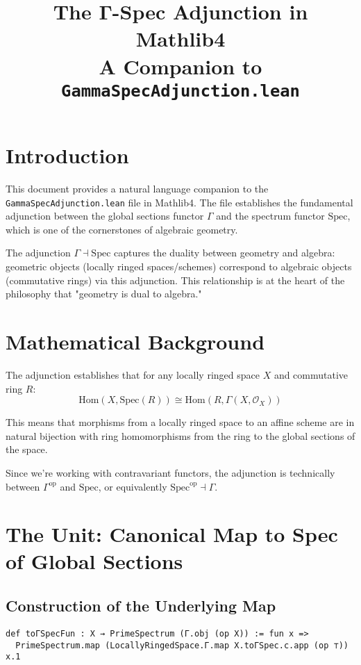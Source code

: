 \documentclass{article}
\title{The Γ-Spec Adjunction in Mathlib4\\
\large A Companion to \texttt{GammaSpecAdjunction.lean}}
\author{}
\date{}
\theoremstyle{definition}
\begin{document}
\maketitle

\section{Introduction}

This document provides a natural language companion to the \texttt{GammaSpecAdjunction.lean} file in Mathlib4. The file establishes the fundamental adjunction between the global sections functor $\Gamma$ and the spectrum functor $\mathrm{Spec}$, which is one of the cornerstones of algebraic geometry.

The adjunction $\Gamma \dashv \mathrm{Spec}$ captures the duality between geometry and algebra: geometric objects (locally ringed spaces/schemes) correspond to algebraic objects (commutative rings) via this adjunction. This relationship is at the heart of the philosophy that "geometry is dual to algebra."

\section{Mathematical Background}

The adjunction establishes that for any locally ringed space $X$ and commutative ring $R$:
$$\text{Hom}(X, \mathrm{Spec}(R)) \cong \text{Hom}(R, \Gamma(X, \mathcal{O}_X))$$

This means that morphisms from a locally ringed space to an affine scheme are in natural bijection with ring homomorphisms from the ring to the global sections of the space.

Since we're working with contravariant functors, the adjunction is technically between $\Gamma^{\text{op}}$ and $\mathrm{Spec}$, or equivalently $\mathrm{Spec}^{\text{op}} \dashv \Gamma$.

\section{The Unit: Canonical Map to Spec of Global Sections}

\subsection{Construction of the Underlying Map}

\begin{lstlisting}
def toΓSpecFun : X → PrimeSpectrum (Γ.obj (op X)) := fun x =>
  PrimeSpectrum.map (LocallyRingedSpace.Γ.map X.toΓSpec.c.app (op ⊤)) x.1
\end{lstlisting}
\end{document}
